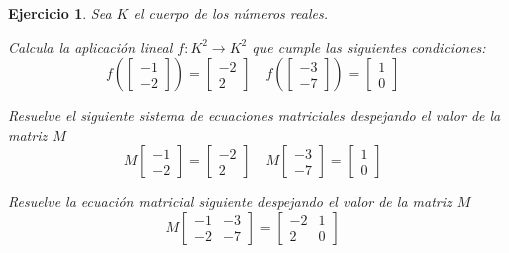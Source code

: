 \documentclass[12pt]{amsart}
\newtheorem{ejer}{Ejercicio}
\begin{document}
\begin{ejer} Sea $K$ el cuerpo de los n\'umeros reales.
\newline
\noindent\begin{minipage}{\textwidth}
\begin{tcolorbox}[colback = green!20!white,title=Versión Aplicación]
Calcula la aplicaci\'on lineal $f:K^{2} \to K^{2}$ que cumple las siguientes condiciones: 
\[f\left(\left[\begin{array}{r}
-1 \\
-2
\end{array}\right]\right) = \left[\begin{array}{r}
-2 \\
2
\end{array}\right] \quad f\left(\left[\begin{array}{r}
-3 \\
-7
\end{array}\right]\right) = \left[\begin{array}{r}
1 \\
0
\end{array}\right] \quad 
\]\end{tcolorbox}
\end{minipage} \newline
\noindent\begin{minipage}{\textwidth}
\begin{tcolorbox}[colback = blue!20!white,title=Versión Sistema Matricial]
Resuelve el siguiente sistema de ecuaciones matriciales despejando el valor de la matriz $M$
\[M \left[\begin{array}{r}
-1 \\
-2
\end{array}\right] = \left[\begin{array}{r}
-2 \\
2
\end{array}\right] \quad M \left[\begin{array}{r}
-3 \\
-7
\end{array}\right] = \left[\begin{array}{r}
1 \\
0
\end{array}\right] \quad 
\]\end{tcolorbox}
\end{minipage} \newline
\noindent\begin{minipage}{\textwidth} 
\begin{tcolorbox}[colback = red!20!white,title=Versión Ecuación Matricial]
Resuelve la ecuación matricial siguiente despejando el valor de la matriz $M$
\[M \left[\begin{array}{rr}
-1 & -3 \\
-2 & -7
\end{array}\right] = \left[\begin{array}{rr}
-2 & 1 \\
2 & 0
\end{array}\right] \quad 
\]
\end{tcolorbox}
\end{minipage}%
\end{ejer}
\end{document}
